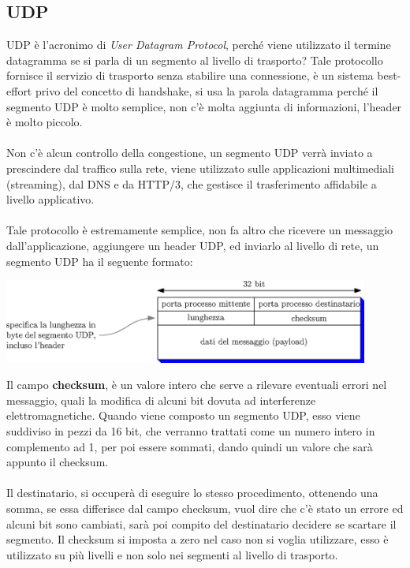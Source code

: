 \documentclass[12pt, letterpaper]{article}
\newcommand{\acc}{\\\hphantom{}\\}
\begin{document}
\subsection{UDP}
UDP è l'acronimo di \textit{User Datagram Protocol}, perché viene utilizzato il termine datagramma se si
parla di un segmento al livello di trasporto? Tale protocollo fornisce il servizio di trasporto senza
stabilire una connessione, è un sistema best-effort privo del concetto di handshake, si usa la parola datagramma
perché il segmento UDP è molto semplice, non c'è molta aggiunta di informazioni, l'header è molto piccolo.
\acc
Non c'è alcun controllo della congestione, un segmento UDP verrà inviato a prescindere dal traffico sulla
rete, viene utilizzato sulle applicazioni multimediali (streaming), dal DNS e da HTTP/3, che
gestisce il trasferimento affidabile a livello applicativo. \acc
Tale protocollo è estremamente semplice, non fa altro che ricevere un messaggio dall'applicazione, aggiungere
un header UDP, ed inviarlo al livello di rete, un segmento UDP ha il seguente formato:\begin{center}
    \includegraphics[width=0.9\textwidth ]{images/segmentoUDP.eps}
\end{center}
Il campo \textbf{checksum}, è un valore intero che serve a rilevare eventuali errori nel messaggio, quali
la modifica di alcuni bit dovuta ad interferenze elettromagnetiche. Quando viene composto un
segmento UDP, esso viene suddiviso in pezzi da 16 bit, che verranno trattati come un numero
intero in complemento ad 1, per poi essere sommati, dando quindi un valore che sarà appunto
il checksum.\acc
Il destinatario, si occuperà di eseguire lo stesso procedimento, ottenendo una somma, se essa differisce
dal campo checksum, vuol dire che c'è stato un errore ed alcuni bit sono cambiati, sarà poi compito
del destinatario decidere se scartare il segmento. Il checksum si imposta a zero nel caso non
si voglia utilizzare, esso è utilizzato su più livelli e non solo nei segmenti al livello di trasporto.
\end{document}
